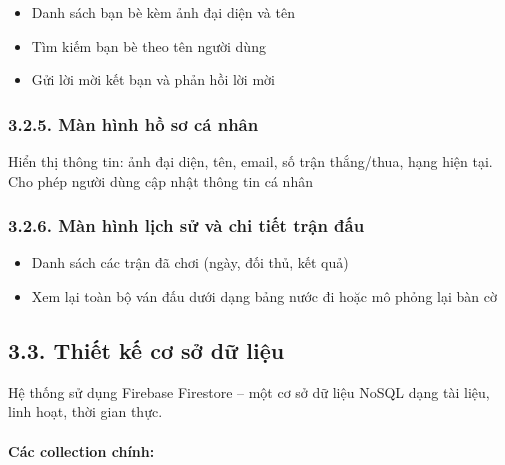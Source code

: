 \documentclass[a4paper,12pt]{article}
\begin{document}
\noindent \begin{itemize}[label=·]
    \item Danh sách bạn bè kèm ảnh đại diện và tên
    \item Tìm kiếm bạn bè theo tên người dùng
    \item Gửi lời mời kết bạn và phản hồi lời mời
\end{itemize}

\subsubsection*{3.2.5. Màn hình hồ sơ cá nhân} %


\noindent Hiển thị thông tin: ảnh đại diện, tên, email, số trận thắng/thua, hạng hiện tại.
\noindent Cho phép người dùng cập nhật thông tin cá nhân

\subsubsection*{3.2.6. Màn hình lịch sử và chi tiết trận đấu} %


\noindent \begin{itemize}[label=·]
    \item Danh sách các trận đã chơi (ngày, đối thủ, kết quả)
    \item Xem lại toàn bộ ván đấu dưới dạng bảng nước đi hoặc mô phỏng lại bàn cờ
\end{itemize}

\subsection*{3.3. Thiết kế cơ sở dữ liệu} %

\justify
\noindent Hệ thống sử dụng Firebase Firestore – một cơ sở dữ liệu NoSQL dạng tài liệu, linh hoạt, thời gian thực.

\paragraph{Các collection chính:} %
\end{document}
